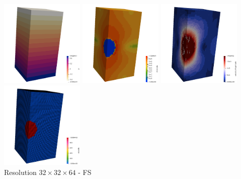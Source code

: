 \begin{center}
\includegraphics[width=4cm]{python_codes/fieldstone_10/results/quarter_FS/press}
\includegraphics[width=4cm]{python_codes/fieldstone_10/results/quarter_FS/sr}
\includegraphics[width=4cm]{python_codes/fieldstone_10/results/quarter_FS/vel}
\includegraphics[width=4cm]{python_codes/fieldstone_10/results/quarter_FS/eta}\\
{\captionfont Resolution $32\times 32\times 64$ - FS}
\end{center}




